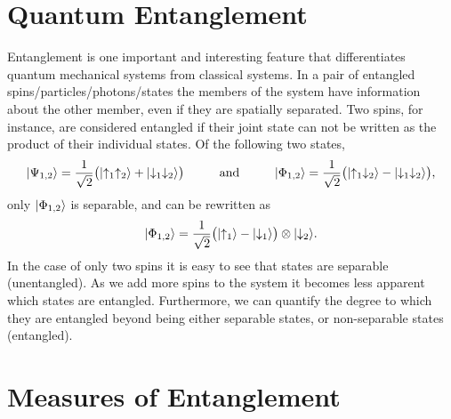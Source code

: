 \section{Quantum Entanglement}
Entanglement is one important and interesting feature that differentiates quantum mechanical systems from classical systems.
In a pair of entangled spins/particles/photons/states the members of the system have information about the other member, even if they are spatially separated.
Two spins, for instance, are considered entangled if their joint state can not be written as the product of their individual states.  Of the following two states,
\begin{equation}
	\lvert {\Psi_{1,2}} \rangle = \frac{1}{\sqrt{2}} \big( \lvert {\uparrow_1\uparrow_2} \rangle + \lvert {\downarrow_1\downarrow_2} \rangle\big) 
	\hspace{1cm} \text{and} \hspace{1cm}
	\lvert {\Phi_{1,2}} \rangle = \frac{1}{\sqrt{2}} \big( \lvert {\uparrow_1\downarrow_2} \rangle - \lvert {\downarrow_1\downarrow_2} \rangle\big), 
\end{equation}
only $\lvert {\Phi_{1,2}} \rangle$ is separable, and can be rewritten as
\begin{equation}
	\lvert {\Phi_{1,2}} \rangle = \frac{1}{\sqrt{2}}  \big( \lvert {\uparrow_1} \rangle - \lvert {\downarrow_1} \rangle\big) \otimes \lvert {\downarrow_2} \rangle.
\end{equation}
In the case of only two spins it is easy to see that states are separable (unentangled). As we add more spins to the system it becomes less apparent which  states are entangled. Furthermore, we can quantify the degree to which they are entangled beyond being either separable states, or non-separable states (entangled).

\section{Measures of Entanglement}

